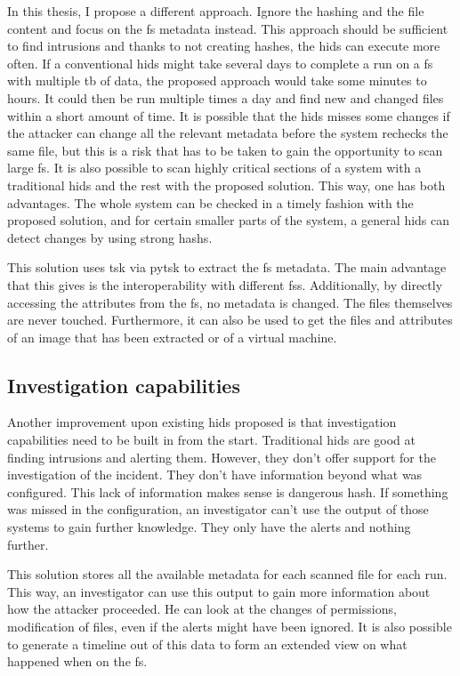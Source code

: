 In this thesis, I propose a different approach. Ignore the hashing and the file content and focus on the \gls{fs} \gls{metadata} instead. This approach should be sufficient to find intrusions and thanks to not creating hashes, the \gls{hids} can execute more often. If a conventional \gls{hids} might take several days to complete a run on a \gls{fs} with multiple \gls{tb} of data, the proposed approach would take some minutes to hours. It could then be run multiple times a day and find new and changed files within a short amount of time. It is possible that the \gls{hids} misses some changes if the attacker can change all the relevant \gls{metadata} before the system rechecks the same file, but this is a risk that has to be taken to gain the opportunity to scan large \gls{fs}. It is also possible to scan highly critical sections of a system with a traditional \gls{hids} and the rest with the proposed solution. This way, one has both advantages. The whole system can be checked in a timely fashion with the proposed solution, and for certain smaller parts of the system, a general \gls{hids} can detect changes by using strong \glspl{hash}.

This solution uses \gls{tsk} via \gls{pytsk} to extract the \gls{fs} \gls{metadata}. The main advantage that this gives is the interoperability with different \glspl{fs}. Additionally, by directly accessing the attributes from the \gls{fs}, no \gls{metadata} is changed. The files themselves are never touched. Furthermore, it can also be used to get the files and attributes of an image that has been extracted or of a virtual machine. 

\subsection{Investigation capabilities}
\label{sec:investigation:capabilities}
Another improvement upon existing \gls{hids} proposed is that investigation capabilities need to be built in from the start. Traditional \gls{hids} are good at finding intrusions and alerting them. However, they don't offer support for the investigation of the incident. They don't have information beyond what was configured. This lack of information makes sense is dangerous \gls{hash}. If something was missed in the configuration, an investigator can't use the output of those systems to gain further knowledge. They only have the alerts and nothing further.

This solution stores all the available \gls{metadata} for each scanned file for each run. This way, an investigator can use this output to gain more information about how the attacker proceeded. He can look at the changes of permissions, modification of files, even if the alerts might have been ignored. It is also possible to generate a timeline out of this data to form an extended view on what happened when on the \gls{fs}. 

